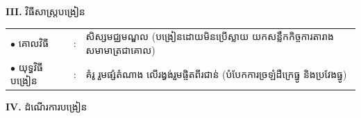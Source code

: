 \documentclass[a4paper,10pt]{article}
\begin{document}
{\vspace{1pt}

\textbf{III.} {\muol វិធីសាស្រ្តបង្រៀន}\\[1pt]
\hspace*{0.45cm}%
\begin{tabular}{@{}l l L{14.85cm}@{}}
  $\bullet$ \hspace{0.25cm} គោលវិធី & : & សិស្សមជ្ឈមណ្ឌល (បង្រៀនដោយមិនប្រើស្លាយ  យកសន្លឹកកិច្ចការតារាងសមាមាត្រជាគោល) \\
  $\bullet$ \hspace{0.25cm} យុទ្ធវិធីបង្រៀន & : & គំរូ  រួមផ្សំតំណាង  លើរង្វង់រួមផ្ចិតពីរជាន់ (បំបែកការច្រឡំដឺក្រេធ្នូ និងប្រវែងធ្នូ) \\
\end{tabular}
}

\vspace{1pt}

\textbf{IV.} {\muol ដំណើរការបង្រៀន}

\vspace{1pt}
\end{document}
